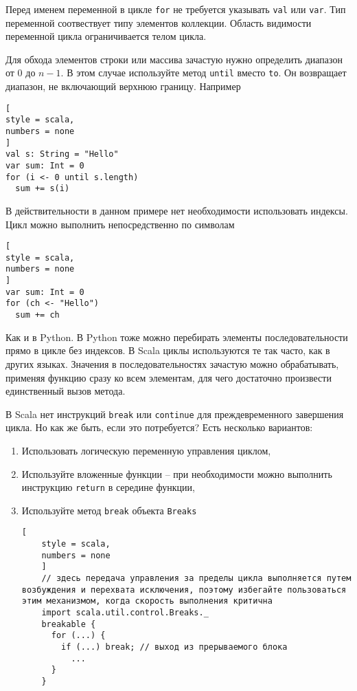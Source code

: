 \documentclass[%
	11pt,
	a4paper,
	utf8,
		]{article}
\begin{document}
Перед именем переменной в цикле \texttt{for} не требуется указывать \texttt{val} или \texttt{var}. Тип переменной соотвествует типу элементов коллекции. Область видимости переменной цикла ограничивается телом цикла.

Для обхода элементов строки или массива зачастую нужно определить диапазон от 0 до $ n - 1 $. В этом случае используйте метод \texttt{until} вместо \texttt{to}. Он возвращает диапазон, не включающий верхнюю границу. Например
\begin{lstlisting}[
style = scala,
numbers = none
]
val s: String = "Hello"
var sum: Int = 0
for (i <- 0 until s.length)
  sum += s(i)
\end{lstlisting}

В действительности в данном примере нет необходимости использовать индексы. Цикл можно выполнить непосредственно по символам
\begin{lstlisting}[
style = scala,
numbers = none
]
var sum: Int = 0
for (ch <- "Hello")
  sum += ch
\end{lstlisting}

Как и в Python. В Python тоже можно перебирать элементы последовательности прямо в цикле без индексов. В Scala циклы используются те так часто, как в других языках. Значения в последовательностях зачастую можно обрабатывать, применяя функцию сразу ко всем элементам, для чего достаточно произвести единственный вызов метода.

В Scala нет инструкций \texttt{break} или \texttt{continue} для преждевременного завершения цикла. Но как же быть, если это потребуется? Есть несколько вариантов:
\begin{enumerate}
	\item Использовать логическую переменную управления циклом,
	
	\item Используйте вложенные функции -- при необходимости можно выполнить инструкцию \texttt{return} в середине функции,
	
	\item Используйте метод \texttt{break} объекта \texttt{Breaks}
	\begin{lstlisting}[
	style = scala,
	numbers = none
	]
	// здесь передача управления за пределы цикла выполняется путем возбуждения и перехвата исключения, поэтому избегайте пользоваться этим механизмом, когда скорость выполнения критична
	import scala.util.control.Breaks._
	breakable {
	  for (...) {
	    if (...) break; // выход из прерываемого блока
	      ...
	  }
	}
	\end{lstlisting}
\end{enumerate}
\end{document}
